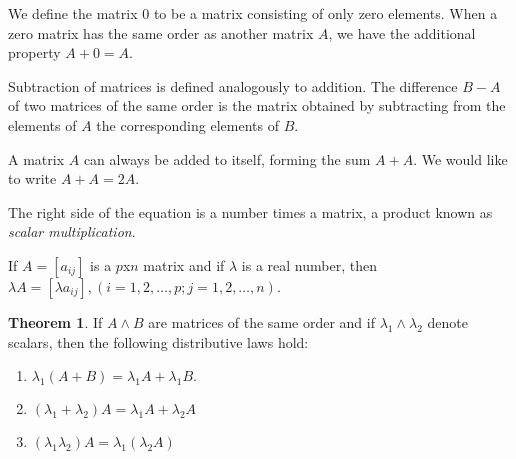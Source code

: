 \documentclass[11pt]{article}
\theoremstyle{definition}
\newtheorem{theorem}{Theorem}
\begin{document}
	We define the matrix $0$ to be a matrix consisting of only zero elements. When a zero matrix has the same order as another matrix $A$, we have the additional property $A + 0 = A$.
	
	Subtraction of matrices is defined analogously to addition. The difference $B - A$ of two matrices of the same order is the matrix obtained by subtracting from the elements of $A$ the corresponding elements of $B$.
	
	A matrix $A$ can always be added to itself, forming the sum $A + A$. We would like to write $A + A = 2A$.
	
	The right side of the equation is a number times a matrix, a product known as \textit{scalar multiplication}.
	
	If $A = [a_{ij}] $ is a $p$x$n$ matrix and if $\lambda$ is a real number, then $ \lambda A = [\lambda a_{ij}], (i=1,2,\dots,p; j=1,2,\dots,n).$
	
	\begin{theorem}
		If $A \land B$ are matrices of the same order and if $\lambda_1 \land \lambda_2$ denote scalars, then the following distributive laws hold: 
		
		\begin{enumerate}[label=(\alph*)]
			\item $\lambda_1 (A+B) = \lambda_1A + \lambda_1B.$
			\item $(\lambda_1 + \lambda_2)A = \lambda_1A + \lambda_2A$
			\item $(\lambda_1\lambda_2)A = \lambda_1(\lambda_2A)$
		\end{enumerate}
	\end{theorem}
\end{document}
